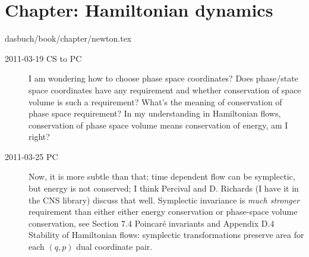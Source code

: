 \section{Chapter: Hamiltonian dynamics}\noindent dasbuch/book/chapter/newton.tex
\begin{description}

\item[2011-03-19 CS to PC]
I am wondering how to choose phase space
coordinates? Does phase/state space coordinates have any requirement and
whether conservation of space volume is such a requirement? What's the
meaning of conservation of phase space requirement? In my understanding
in Hamiltonian flows, conservation of phase space volume means
conservation of energy, am I right?

\item[2011-03-25 PC]
Now, it is more subtle than that; time dependent flow can be symplectic,
but energy is not conserved; I think Percival and D.
Richards (I have it in the
 {CNS library})
discuss that well. Symplectic invariance is \emph{much stronger}
requirement than either either energy conservation or phase-space volume
conservation, see 
{Section 7.4 Poincar\'e invariants} and
 {Appendix D.4
Stability of Hamiltonian flows}: symplectic transformations preserve area
for each $(q,p)$ dual coordinate  pair.

\end{description}


